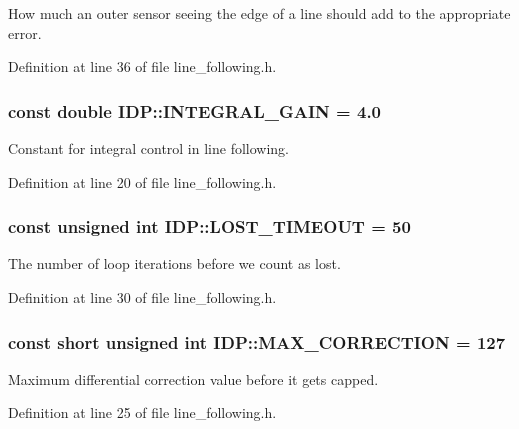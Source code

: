 How much an outer sensor seeing the edge of a line should add to the appropriate error. 



Definition at line 36 of file line\_\-following.h.

\hypertarget{namespaceIDP_a9107eef10d68ba30176633afd87f1ed4}{
\subsubsection[{INTEGRAL\_\-GAIN}]{\setlength{\rightskip}{0pt plus 5cm}const double {\bf IDP::INTEGRAL\_\-GAIN} = 4.0}}
\label{namespaceIDP_a9107eef10d68ba30176633afd87f1ed4}


Constant for integral control in line following. 



Definition at line 20 of file line\_\-following.h.

\hypertarget{namespaceIDP_ac845248570cca0705d43e2dbb085c3cb}{
\subsubsection[{LOST\_\-TIMEOUT}]{\setlength{\rightskip}{0pt plus 5cm}const unsigned int {\bf IDP::LOST\_\-TIMEOUT} = 50}}
\label{namespaceIDP_ac845248570cca0705d43e2dbb085c3cb}


The number of loop iterations before we count as lost. 



Definition at line 30 of file line\_\-following.h.

\hypertarget{namespaceIDP_a246919caaacabcb0399802d542d8330b}{
\subsubsection[{MAX\_\-CORRECTION}]{\setlength{\rightskip}{0pt plus 5cm}const short unsigned int {\bf IDP::MAX\_\-CORRECTION} = 127}}
\label{namespaceIDP_a246919caaacabcb0399802d542d8330b}


Maximum differential correction value before it gets capped. 



Definition at line 25 of file line\_\-following.h.


